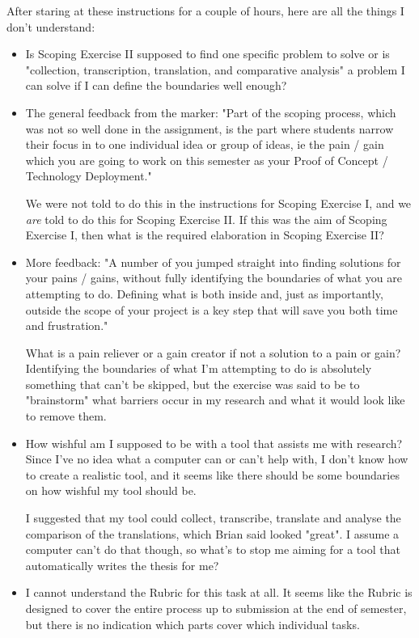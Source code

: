 \documentclass[12pt]{article}
\begin{document}
After staring at these instructions for a couple of hours, here are all the things I don't understand:
\begin{itemize}
    \item Is Scoping Exercise II supposed to find one specific problem to solve or is "collection, transcription, translation, and comparative analysis" a problem I can solve if I can define the boundaries well enough?
    \item The general feedback from the marker: "Part of the scoping process, which was not so well done in the assignment, is the part where students narrow their focus in to one individual idea or group of ideas, ie the pain / gain which you are going to work on this semester as your Proof of Concept / Technology Deployment." 
    
    We were not told to do this in the instructions for Scoping Exercise I, and we \textit{are} told to do this for Scoping Exercise II. If this was the aim of Scoping Exercise I, then what is the required elaboration in Scoping Exercise II?
    \item More feedback: "A number of you jumped straight into finding solutions for your pains / gains, without fully identifying the boundaries of what you are attempting to do. Defining what is both inside and, just as importantly, outside the scope of your project is a key step that will save you both time and frustration."
    
    What is a pain reliever or a gain creator if not a solution to a pain or gain? Identifying the boundaries of what I'm attempting to do is absolutely something that can't be skipped, but the exercise was said to be to "brainstorm" what barriers occur in my research and what it would look like to remove them.
    \item How wishful am I supposed to be with a tool that assists me with research? Since I've no idea what a computer can or can't help with, I don't know how to create a realistic tool, and it seems like there should be some boundaries on how wishful my tool should be.
    
    I suggested that my tool could collect, transcribe, translate and analyse the comparison of the translations, which Brian said looked "great". I assume a computer can't do that though, so what's to stop me aiming for a tool that automatically writes the thesis for me?
    
    \item I cannot understand the Rubric for this task at all. It seems like the Rubric is designed to cover the entire process up to submission at the end of semester, but there is no indication which parts cover which individual tasks.
    

\end{itemize}
\end{document}
